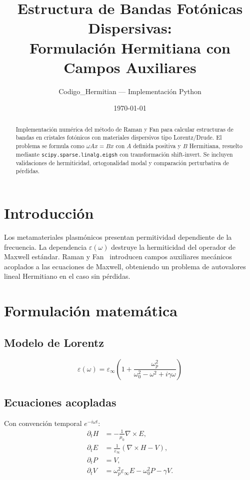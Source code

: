 \documentclass[12pt,a4paper]{article}
\title{Estructura de Bandas Fotónicas Dispersivas:\\
Formulación Hermitiana con Campos Auxiliares}
\author{Codigo\_Hermitian --- Implementación Python}
\date{\today}
\begin{document}
\maketitle

\begin{abstract}
Implementación numérica del método de Raman y Fan para calcular estructuras
de bandas en cristales fotónicos con materiales dispersivos tipo Lorentz/Drude.
El problema se formula como $\omega A x = B x$ con $A$ definida positiva y
$B$ Hermitiana, resuelto mediante \texttt{scipy.sparse.linalg.eigsh} con
transformación shift-invert. Se incluyen validaciones de hermiticidad,
ortogonalidad modal y comparación perturbativa de pérdidas.
\end{abstract}

\section{Introducción}

Los metamateriales plasmónicos presentan permitividad dependiente de la
frecuencia. La dependencia $\varepsilon(\omega)$ destruye la hermiticidad
del operador de Maxwell estándar. Raman y Fan~\cite{Raman2010} introducen
campos auxiliares mecánicos acoplados a las ecuaciones de Maxwell, obteniendo
un problema de autovalores lineal Hermitiano en el caso sin pérdidas.

\section{Formulación matemática}

\subsection{Modelo de Lorentz}

\begin{equation}
  \varepsilon(\omega) = \varepsilon_\infty
  \left(1 + \frac{\omega_p^2}{\omega_0^2 - \omega^2 + i\gamma\omega}\right)
\end{equation}

\subsection{Ecuaciones acopladas}

Con convención temporal $e^{-i\omega t}$:
\begin{align}
  \partial_t H &= -\frac{1}{\mu_0}\nabla\times E, \\
  \partial_t E &= \frac{1}{\varepsilon_\infty}(\nabla\times H - V), \\
  \partial_t P &= V, \\
  \partial_t V &= \omega_p^2\varepsilon_\infty E - \omega_0^2 P - \gamma V.
\end{align}
\end{document}
